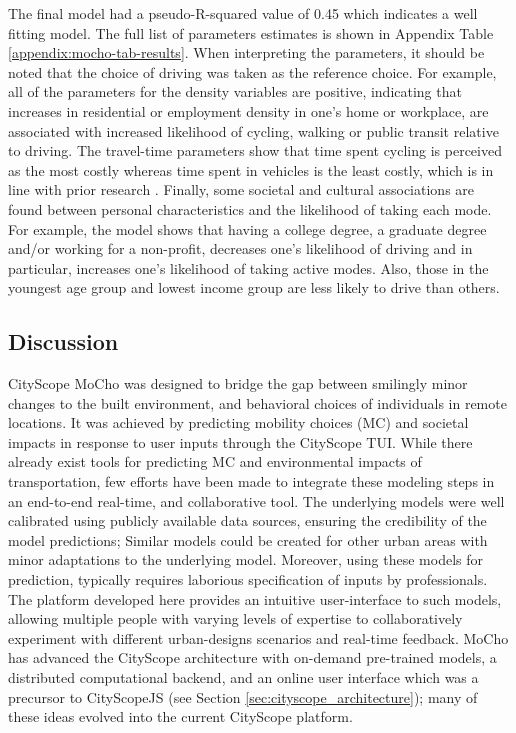 {{{            The final model had a pseudo-R-squared value of 0.45 which indicates a well fitting model. The full list of parameters estimates is shown in Appendix Table \eqref{appendix:mocho-tab-results}. When interpreting the parameters, it should be noted that the choice of driving was taken as the reference choice. For example, all of the parameters for the density variables are positive, indicating that increases in residential or employment density in one's home or workplace, are associated with increased likelihood of cycling, walking or public transit relative to driving. The travel-time parameters show that time spent cycling is perceived as the most costly whereas time spent in vehicles is the least costly, which is in line with prior research \cite{koppelman2006self}. Finally, some societal and cultural associations are found between personal characteristics and the likelihood of taking each mode. For example, the model shows that having a college degree, a graduate degree and/or working for a non-profit, decreases one's likelihood of driving and in particular, increases one's likelihood of taking active modes. Also, those in the youngest age group and lowest income group are less likely to drive than others.
        }
    }
    \subsection{Discussion}
    {
        CityScope MoCho was designed to bridge the gap between smilingly minor changes to the built environment, and behavioral choices of individuals in remote locations. It was achieved by predicting mobility choices (MC) and societal impacts in response to user inputs through the CityScope TUI. While there already exist tools for predicting MC and environmental impacts of transportation, few efforts have been made to integrate these modeling steps in an end-to-end real-time, and collaborative tool.
        The underlying models were well calibrated using publicly available data sources, ensuring the credibility of the model predictions; Similar models could be created for other urban areas with minor adaptations to the underlying model.
        \newline
        Moreover, using these models for prediction, typically requires laborious specification of inputs by professionals. The platform developed here provides an intuitive user-interface to such models, allowing multiple people with varying levels of expertise to collaboratively experiment with different urban-designs scenarios and real-time feedback. MoCho has advanced the CityScope architecture with on-demand pre-trained models, a distributed computational backend, and an online user interface which was a precursor to CityScopeJS (see Section \eqref{sec:cityscope_architecture}); many of these ideas evolved into the current CityScope platform.
    }
}